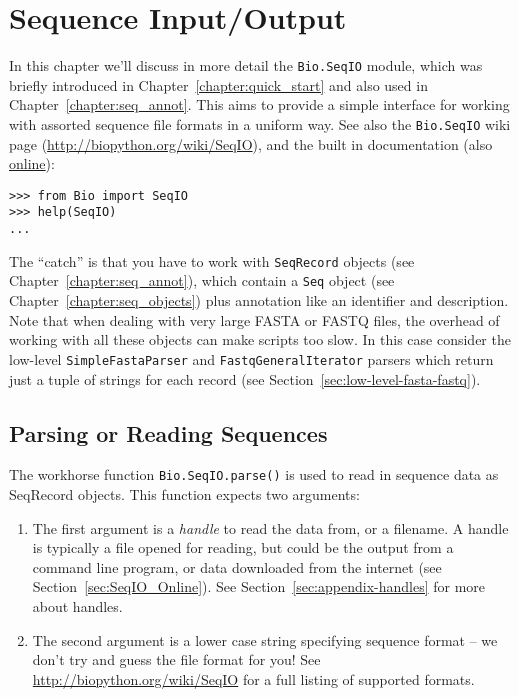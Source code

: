 \chapter{Sequence Input/Output}
\label{chapter:seqio}

In this chapter we'll discuss in more detail the \verb|Bio.SeqIO| module, which was briefly introduced in Chapter~\ref{chapter:quick_start} and also used in Chapter~\ref{chapter:seq_annot}. This aims to provide a simple interface for working with assorted sequence file formats in a uniform way.
See also the \verb|Bio.SeqIO| wiki page (\url{http://biopython.org/wiki/SeqIO}), and the built in documentation (also \href{http://biopython.org/DIST/docs/api/Bio.SeqIO-module.html}{online}):

\begin{verbatim}
>>> from Bio import SeqIO
>>> help(SeqIO)
...
\end{verbatim}

The ``catch'' is that you have to work with \verb|SeqRecord| objects (see Chapter~\ref{chapter:seq_annot}), which contain a \verb|Seq| object (see Chapter~\ref{chapter:seq_objects}) plus annotation like an identifier and description.
Note that when dealing with very large FASTA or FASTQ files, the overhead of working with all these objects can make scripts too slow.
In this case consider the low-level \verb|SimpleFastaParser| and \verb|FastqGeneralIterator| parsers which return just a tuple of strings for each record (see Section~\ref{sec:low-level-fasta-fastq}).

\section{Parsing or Reading Sequences}
\label{sec:Bio.SeqIO-input}

The workhorse function \verb|Bio.SeqIO.parse()| is used to read in sequence data as SeqRecord objects.  This function expects two arguments:

\begin{enumerate}
\item The first argument is a {\it handle} to read the data from, or a filename. A handle is typically a file opened for reading, but could be the output from a command line program, or data downloaded from the internet (see Section~\ref{sec:SeqIO_Online}).  See Section~\ref{sec:appendix-handles} for more about handles.
\item The second argument is a lower case string specifying sequence format -- we don't try and guess the file format for you!  See \url{http://biopython.org/wiki/SeqIO} for a full listing of supported formats.
\end{enumerate}


